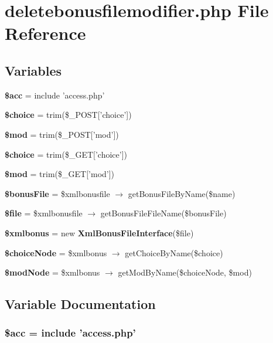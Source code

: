\section{deletebonusfilemodifier.php File Reference}
\label{deletebonusfilemodifier_8php}


\subsection*{Variables}
\begin{CompactItemize}
\item 
{\bf \$acc} = include 'access.php'
\item 
{\bf \$choice} = trim(\$\_\-POST['choice'])
\item 
{\bf \$mod} = trim(\$\_\-POST['mod'])
\item 
{\bf \$choice} = trim(\$\_\-GET['choice'])
\item 
{\bf \$mod} = trim(\$\_\-GET['mod'])
\item 
{\bf \$bonus\-File} = \$xmlbonusfile $\rightarrow$ get\-Bonus\-File\-By\-Name(\$name)
\item 
{\bf \$file} = \$xmlbonusfile $\rightarrow$ get\-Bonus\-File\-File\-Name(\$bonus\-File)
\item 
{\bf \$xmlbonus} = new {\bf Xml\-Bonus\-File\-Interface}(\$file)
\item 
{\bf \$choice\-Node} = \$xmlbonus $\rightarrow$ get\-Choice\-By\-Name(\$choice)
\item 
{\bf \$mod\-Node} = \$xmlbonus $\rightarrow$ get\-Mod\-By\-Name(\$choice\-Node, \$mod)
\end{CompactItemize}


\subsection{Variable Documentation}
\subsubsection{\setlength{\rightskip}{0pt plus 5cm}\$acc = include 'access.php'}\label{deletebonusfilemodifier_8php_542926c588a05eb69553d79c83cf73da}


